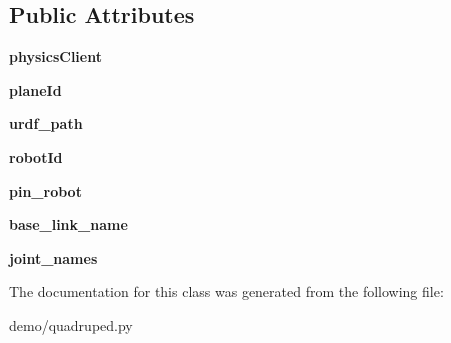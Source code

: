 \subsection*{Public Attributes}
\begin{DoxyCompactItemize}
\item 
{\bfseries physics\+Client}\hypertarget{classquadruped_1_1QuadrupedRobot_aa887aeaac1b638e055e79f18e03a045d}{}\label{classquadruped_1_1QuadrupedRobot_aa887aeaac1b638e055e79f18e03a045d}

\item 
{\bfseries plane\+Id}\hypertarget{classquadruped_1_1QuadrupedRobot_a49f5fd9cb0672ae09162c99646ac5445}{}\label{classquadruped_1_1QuadrupedRobot_a49f5fd9cb0672ae09162c99646ac5445}

\item 
{\bfseries urdf\+\_\+path}\hypertarget{classquadruped_1_1QuadrupedRobot_a467b697aeca43fd6864e6cd022046aa6}{}\label{classquadruped_1_1QuadrupedRobot_a467b697aeca43fd6864e6cd022046aa6}

\item 
{\bfseries robot\+Id}\hypertarget{classquadruped_1_1QuadrupedRobot_a105f6c0b8ffc1d09f9131934608a20dd}{}\label{classquadruped_1_1QuadrupedRobot_a105f6c0b8ffc1d09f9131934608a20dd}

\item 
{\bfseries pin\+\_\+robot}\hypertarget{classquadruped_1_1QuadrupedRobot_a5a3e8b0ed6f8b333adb8c9416b394d11}{}\label{classquadruped_1_1QuadrupedRobot_a5a3e8b0ed6f8b333adb8c9416b394d11}

\item 
{\bfseries base\+\_\+link\+\_\+name}\hypertarget{classquadruped_1_1QuadrupedRobot_ad5320c45135714963a6f8cd85f8eaef7}{}\label{classquadruped_1_1QuadrupedRobot_ad5320c45135714963a6f8cd85f8eaef7}

\item 
{\bfseries joint\+\_\+names}\hypertarget{classquadruped_1_1QuadrupedRobot_ac5b376bb29520b25119944ee667987f2}{}\label{classquadruped_1_1QuadrupedRobot_ac5b376bb29520b25119944ee667987f2}

\end{DoxyCompactItemize}


The documentation for this class was generated from the following file\+:\begin{DoxyCompactItemize}
\item 
demo/quadruped.\+py\end{DoxyCompactItemize}
